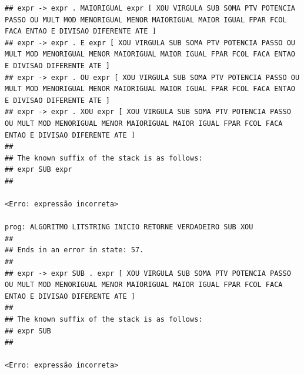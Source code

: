 \documentclass[hidelinks,12pt]{article}
\begin{document}
\begin{lstlisting}
## expr -> expr . MAIORIGUAL expr [ XOU VIRGULA SUB SOMA PTV POTENCIA PASSO OU MULT MOD MENORIGUAL MENOR MAIORIGUAL MAIOR IGUAL FPAR FCOL FACA ENTAO E DIVISAO DIFERENTE ATE ]
## expr -> expr . E expr [ XOU VIRGULA SUB SOMA PTV POTENCIA PASSO OU MULT MOD MENORIGUAL MENOR MAIORIGUAL MAIOR IGUAL FPAR FCOL FACA ENTAO E DIVISAO DIFERENTE ATE ]
## expr -> expr . OU expr [ XOU VIRGULA SUB SOMA PTV POTENCIA PASSO OU MULT MOD MENORIGUAL MENOR MAIORIGUAL MAIOR IGUAL FPAR FCOL FACA ENTAO E DIVISAO DIFERENTE ATE ]
## expr -> expr . XOU expr [ XOU VIRGULA SUB SOMA PTV POTENCIA PASSO OU MULT MOD MENORIGUAL MENOR MAIORIGUAL MAIOR IGUAL FPAR FCOL FACA ENTAO E DIVISAO DIFERENTE ATE ]
##
## The known suffix of the stack is as follows:
## expr SUB expr 
##

<Erro: expressão incorreta>

prog: ALGORITMO LITSTRING INICIO RETORNE VERDADEIRO SUB XOU 
##
## Ends in an error in state: 57.
##
## expr -> expr SUB . expr [ XOU VIRGULA SUB SOMA PTV POTENCIA PASSO OU MULT MOD MENORIGUAL MENOR MAIORIGUAL MAIOR IGUAL FPAR FCOL FACA ENTAO E DIVISAO DIFERENTE ATE ]
##
## The known suffix of the stack is as follows:
## expr SUB 
##

<Erro: expressão incorreta>


\end{lstlisting}
\end{document}

